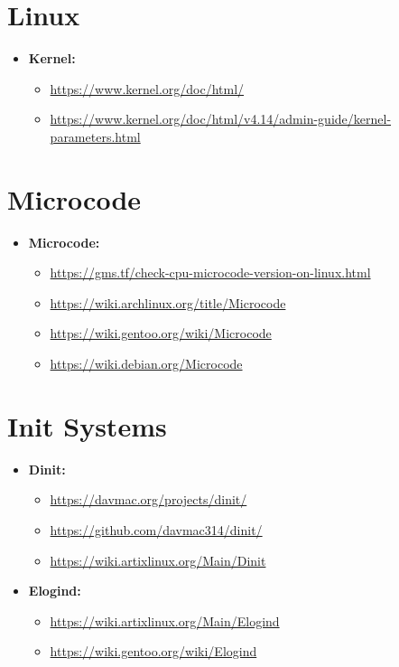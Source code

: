 \documentclass[10pt, a4paper, onecolumn, oneside, titlepage, openany]{book}
\begin{document}
\section{Linux}
\begin{itemize}
    \item \textbf{Kernel:}
    \begin{itemize}
        \item \url{https://www.kernel.org/doc/html/}
        \item \url{https://www.kernel.org/doc/html/v4.14/admin-guide/kernel-parameters.html}
    \end{itemize}
\end{itemize}

\section{Microcode}
\begin{itemize}
    \item \textbf{Microcode:}
    \begin{itemize}
        \item \url{https://gms.tf/check-cpu-microcode-version-on-linux.html}
        \item \url{https://wiki.archlinux.org/title/Microcode}
        \item \url{https://wiki.gentoo.org/wiki/Microcode}
        \item \url{https://wiki.debian.org/Microcode}
    \end{itemize}
\end{itemize}

\section{Init Systems}
\begin{itemize}
    \item \textbf{Dinit:}
    \begin{itemize}
        \item \url{https://davmac.org/projects/dinit/}
        \item \url{https://github.com/davmac314/dinit/}
        \item \url{https://wiki.artixlinux.org/Main/Dinit}
    \end{itemize}
    \item \textbf{Elogind:}
    \begin{itemize}
        \item \url{https://wiki.artixlinux.org/Main/Elogind}
        \item \url{https://wiki.gentoo.org/wiki/Elogind}
    \end{itemize}
\end{itemize}
\end{document}
